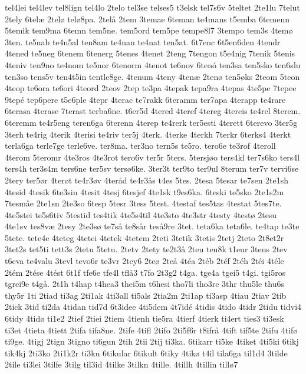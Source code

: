 {tel4lei
tel4lev
tel8lign
tel4lo
2telo
tel3se
telses5
t3elsk
tel7s6v
5teltet
2te1lu
7telut
2tely
6telæ
2telø
telø8pa.
2telå
2tem
3temae
6teman
te4mans
t5emba
6temenn
5temik
tem9ma
6temn
tem5ne.
tem5ord
tem5pe
tempe8l7
3tempo
tem3s
4temø
3ten.
te5nab
te4n5al
ten8am
te4nan
te4nat
ten5at.
6t7enc
6t5en6den
4tendr
4tened
te5neg
6tenem
6tenerg
5tenes
4tenet
2teng
7tengon
t5e4nig
7tenik
5tenis
4teniv
ten9no
te4nom
te5nor
6tenorm
4tenot
te6nov
6tenó
ten3sa
ten5sko
ten6slu
ten3so
tens5v
ten4t5in
tentle8ge.
4tenum
4teny
4tenæ
2tenø
ten5øks
2teom
5teon
4teop
te6ora
te6ori
4teord
2teov
2tep
te3pa
4tepak
tepa9ra
4tepas
4te5pe
7tepee
9tepé
tep6pere
t5e6ple
4tepr
4terac
te7rakk
6teramm
ter7apa
4terapp
te4rare
6terasa
4terase
7terast
terba6ne.
t6er5d
4tered
4teref
4tereg
4tereis
te4rel
8terem.
6teremm
te4r5eng
teren6ga
6terenn
4terep
te4rerk
ter5esti
4terett
6terevo
3ter5g
3terh
te4rig
4terik
4terisi
te4riv
ter5j
4terk.
4terke
4terkh
7terkr
6terks4
4terkt
terla6ga
terle7ge
terle6ve.
ter8ma.
ter3no
tern5s
te5ro.
tero6e
te3rof
4teroll
4terom
5teromr
4te3ros
4te3rot
tero6v
ter5r
5ters.
5tersjøo
ters4kl
ter7s6ko
ters4l
ters4h
ter3s4m
ters6ne
ter5sv
tersø6ke.
3ter3t
ter9to
ter9ul
8terum
ter7v
tervi6se
2tery
ter5ør
4terøt
te4r3øv
4teråd
te4r3ås
t4es
5tes.
2tesa
5tesar
te7sen
2te1sh
4tesid
4tesik
6te3sin
4tesit
4tesj
6tesjef
4te1sk
t9es6ka.
6teski
te5sko
2te1s2m
7tesmåe
2te1sn
2te3so
6tesp
5tesr
3tess
5test.
4testaf
tes5tas
4testat
5tes7te.
4te5stei
te5s6tiv
5testid
tes4tik
4te5s4til
4te3sto
4te3str
4testy
4testø
2tesu
4te1sv
tes8væ
2tesy
2te3sø
te7så
te8sår
teså9re
3tet.
teta6ka
teta6le.
te4tap
te3te
5tete.
tete4e
4teteg
4tetei
4tetek
4tetem
2teti
3tetik
3tetis
2tetj
2teto
2t8et2r
3tet2s
tet5ti
tett3s
2tetu
5tetu.
2tetv
2tety
te2t3å
2teu
teu8k
t1eur
3teus
2tev
t6eva
te4valu
3tevl
tevo6r
te3vr
2tey6
2teø
2teå
4téa
2téb
2téf
2téh
2téi
4téle
2tém
2tése
4tést
6t1f
tfe6e
tfe4l
tflå3
t7fo
2t3g2
t4ga.
tge4a
tgei5
t4gi.
tgi5ros
tgrei9e
t4gå.
2t1h
t4hap
t4hea3
thei5m
t6hesi
tho7li
tho3re
3thr
thu5le
thu6s
thy5r
1ti
2tiad
ti3ag
2ti1ak
4ti3all
ti5als
2tia2m
2ti1ap
ti3asp
4tiau
2tiav
2tib
2tick
3tid
ti2da
4tidan
tid7d
6t3idee
4ti5dem
4t7idé
4tidis
4tido
4tidr
2tidu
tidvi4
6tidy
4tidø
ti1e2
2tief
2tiei
2tiem
4tienh
tie5ra
4tierf
4tierk
ti4ert
ties3
ti3esk
ti3et
4tieta
4tiett
2tifa
tifa8ne.
2tife
4tifl
2tifo
2ti5f6r
t8ifrå
4tift
tif5te
2tifu
4tifø
ti9ge.
4tigj
2tign
3tigno
ti6gun
2tih
2tii
2tij
ti3ka.
6tikarr
ti5ke
4tiket
4ti5ki
6tikj
tik4kj
2ti3ko
2ti1k2r
ti3ku
6tikular
6tikult
6tiky
4tikø
t4il
tila6ga
til1d4
3tilde
2tile
ti3lei
3tilfe
3tilg
til3id
4tilke
3tilkn
4tille.
4tillh
4tillin
tillø7
}
